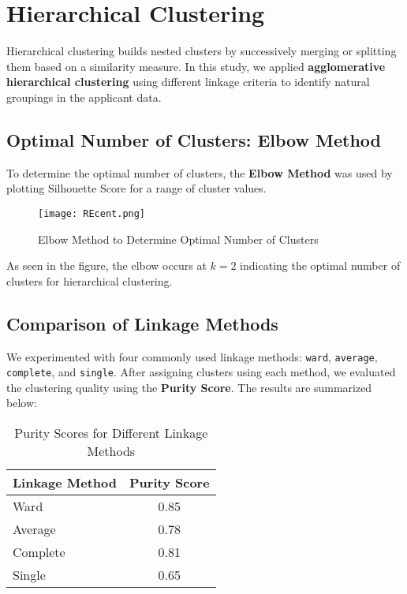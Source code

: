 \documentclass{article}
\begin{document}
\section{Hierarchical Clustering}

Hierarchical clustering builds nested clusters by successively merging or splitting them based on a similarity measure. In this study, we applied \textbf{agglomerative hierarchical clustering} using different linkage criteria to identify natural groupings in the applicant data.

\subsection{Optimal Number of Clusters: Elbow Method}

To determine the optimal number of clusters, the \textbf{Elbow Method} was used by plotting Silhouette Score for a range of cluster values.

\begin{figure}[h!]
    \centering
    \texttt{[image: REcent.png]}
    \caption{Elbow Method to Determine Optimal Number of Clusters}
\end{figure}

As seen in the figure, the elbow occurs at \( k = 2 \) indicating the optimal number of clusters for hierarchical clustering.

\subsection{Comparison of Linkage Methods}

We experimented with four commonly used linkage methods: \texttt{ward}, \texttt{average}, \texttt{complete}, and \texttt{single}. After assigning clusters using each method, we evaluated the clustering quality using the \textbf{Purity Score}. The results are summarized below:

\begin{table}[h!]
    \centering
    \caption{Purity Scores for Different Linkage Methods}
    \begin{tabular}{@{}lc@{}}
    \toprule
    \textbf{Linkage Method} & \textbf{Purity Score} \\
    \midrule
    Ward     & 0.85 \\
    Average  & 0.78 \\
    Complete & 0.81 \\
    Single   & 0.65 \\
    \bottomrule
    \end{tabular}
\end{table}
\end{document}
